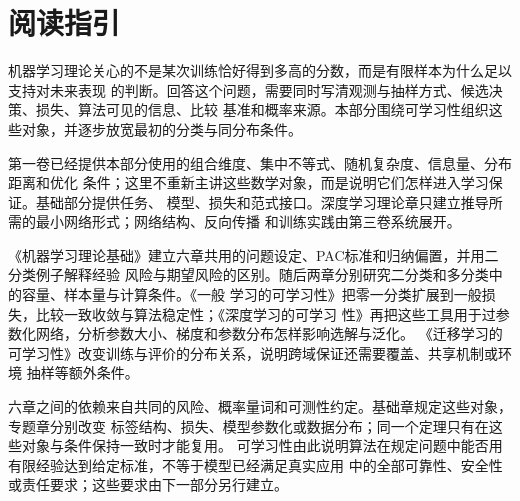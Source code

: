 \chapter*{阅读指引}

机器学习理论关心的不是某次训练恰好得到多高的分数，而是有限样本为什么足以支持对未来表现
的判断。回答这个问题，需要同时写清观测与抽样方式、候选决策、损失、算法可见的信息、比较
基准和概率来源。本部分围绕可学习性组织这些对象，并逐步放宽最初的分类与同分布条件。

第一卷已经提供本部分使用的组合维度、集中不等式、随机复杂度、信息量、分布距离和优化
条件；这里不重新主讲这些数学对象，而是说明它们怎样进入学习保证。基础部分提供任务、
模型、损失和范式接口。深度学习理论章只建立推导所需的最小网络形式；网络结构、反向传播
和训练实践由第三卷系统展开。

《机器学习理论基础》建立六章共用的问题设定、PAC标准和归纳偏置，并用二分类例子解释经验
风险与期望风险的区别。随后两章分别研究二分类和多分类中的容量、样本量与计算条件。《一般
学习的可学习性》把零一分类扩展到一般损失，比较一致收敛与算法稳定性；《深度学习的可学习
性》再把这些工具用于过参数化网络，分析参数大小、梯度和参数分布怎样影响选解与泛化。
《迁移学习的可学习性》改变训练与评价的分布关系，说明跨域保证还需要覆盖、共享机制或环境
抽样等额外条件。

六章之间的依赖来自共同的风险、概率量词和可测性约定。基础章规定这些对象，专题章分别改变
标签结构、损失、模型参数化或数据分布；同一个定理只有在这些对象与条件保持一致时才能复用。
可学习性由此说明算法在规定问题中能否用有限经验达到给定标准，不等于模型已经满足真实应用
中的全部可靠性、安全性或责任要求；这些要求由下一部分另行建立。
